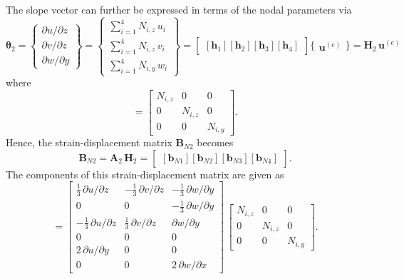 The slope vector can further be expressed in terms of the nodal parameters via
\small
\begin{equation}
\boldsymbol{\theta}_2 =  \begin{Bmatrix}
\partial u / \partial z\\
\partial v / \partial z \\
\partial w / \partial y
\end{Bmatrix}
= \begin{Bmatrix}
\sum\nolimits_{i=1}^4 N_{i,z} \, u_i\\
\sum\nolimits_{i=1}^4 N_{i,z} \, v_i \\
\sum\nolimits_{i=1}^4 N_{i,y} \, w_i
\end{Bmatrix} 
= \begin{bmatrix}
[\mathbf{h}_1] [\mathbf{h}_2] [\mathbf{h}_3] [\mathbf{h}_4] 
\end{bmatrix} \bigl\{ \begin{matrix} \mathbf{u}^{(e)} \end{matrix} \bigr\}
= \mathbf{H}_2 \, \mathbf{u}^{(e)} 
\end{equation}
\normalsize
where 
\begin{equation}
[\mathbf{h}_i] = \begin{bmatrix}
N_{i,z} &  0 & 0  \\
0 & N_{i,z} & 0  \\
0 & 0 & N_{i,y} \end{bmatrix} .
\end{equation}
Hence, the strain-displacement matrix $\mathbf{B}_{N2}$ becomes
\begin{equation}
\mathbf{B}_{N2} = \mathbf{A}_2 \, \mathbf{H}_2 = \begin{bmatrix}
[\mathbf{b}_{N1}] [\mathbf{b}_{N2}] [\mathbf{b}_{N3}] [\mathbf{b}_{N4}]
\end{bmatrix}. 
\end{equation}
The components of this strain-displacement matrix are given as
\begin{equation}
[\mathbf{b}_{Ni}] =  \begin{bmatrix}
	\tfrac{1}{3} \, \partial u / \partial z &  - \tfrac{1}{3} \, \partial v / \partial z & - \tfrac{1}{3} \, \partial w / \partial y  \\
	0 & 0 & - \tfrac{1}{3} \, \partial w / \partial y  \\
	-\tfrac{1}{3} \, \partial u / \partial z  & \tfrac{1}{3} \, \partial v / \partial z & \partial w / \partial y \\
	0 & 0 & 0  \\
	2 \, \partial u / \partial y &  0 & 0 \\
	0 &  0 &  2 \, \partial w / \partial x  \end{bmatrix} \, \begin{bmatrix}
N_{i,z} &  0 & 0  \\
0 & N_{i,z} & 0  \\
0 & 0 & N_{i,y}  \end{bmatrix}. 
\end{equation}

